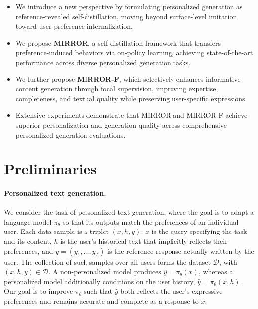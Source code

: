 \documentclass{article} %
\begin{document}
\begin{itemize}[leftmargin=1.2em,itemsep=1pt,topsep=2pt,parsep=0pt,partopsep=0pt]
    \item We introduce a new perspective by formulating personalized generation as reference-revealed self-distillation, moving beyond surface-level imitation toward user preference internalization.

    \item We propose \textbf{MIRROR}, a self-distillation framework that transfers preference-induced behaviors via on-policy learning, achieving state-of-the-art performance across diverse personalized generation tasks.
    
    \item We further propose \textbf{MIRROR-F}, which selectively enhances informative content generation through focal supervision, improving expertise, completeness, and textual quality while preserving user-specific expressions.
    
    \item Extensive experiments demonstrate that MIRROR and MIRROR-F achieve superior personalization and generation quality across comprehensive personalized generation evaluations.
\end{itemize}

\section{Preliminaries}
\label{Preliminaries}

\paragraph{Personalized text generation.}
We consider the task of personalized text generation, where the goal is to adapt a
language model $\pi_\theta$ so that its outputs match the preferences of an individual
user. Each data sample is a triplet $(x, h, y)$: $x$ is the query specifying the task and
its content, $h$ is the user's historical text that implicitly reflects their preferences,
and $y = (y_1, \dots, y_T)$ is the reference response actually written by the user. The
collection of such samples over all users forms the dataset $\mathcal{D}$, with
$(x, h, y) \in \mathcal{D}$. A non-personalized model produces
$\hat{y} = \pi_\theta(x)$, whereas a personalized model additionally conditions on the
user history, $\hat{y} = \pi_\theta(x, h)$. Our goal is to improve $\pi_\theta$ such that
$\hat{y}$ both reflects the user's expressive preferences and remains accurate and
complete as a response to $x$.
\end{document}
